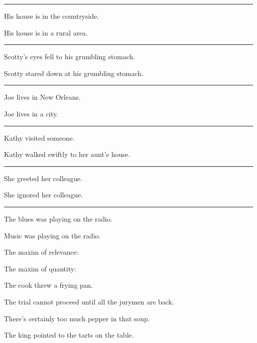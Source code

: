 \documentclass[addpoints]{exam}
\begin{document}
\begin{questions}

        \question[1] \rule{4cm}{0.4pt} \parbox[t]{\linewidth}{
                                         His house is in the countryside.

                                         His house is in a rural area.
                                       }
          \newpage
        \question[1] \rule{4cm}{0.4pt} \parbox[t]{\linewidth}{
                                         Scotty's eyes fell to his grumbling stomach.

                                         Scotty stared down at his grumbling stomach.
                                       }
        \question[1] \rule{4cm}{0.4pt} \parbox[t]{\linewidth}{
                                         Joe lives in New Orleans.

                                         Joe lives in a city.
                                       }
        \question[1] \rule{4cm}{0.4pt} \parbox[t]{\linewidth}{
                                         Kathy visited someone.

                                         Kathy walked swiftly to her aunt's house.
                                       }
        \question[1] \rule{4cm}{0.4pt} \parbox[t]{\linewidth}{
                                         She greeted her colleague.

                                         She ignored her colleague.
                                       }
        \question[1] \rule{4cm}{0.4pt} \parbox[t]{\linewidth}{
                                         The blues was playing on the radio.

                                         Music was playing on the radio.
                                       }

        \question[2] The maxim of relevance: \hrulefill

          \hrulefill
        \question[2] The maxim of quantity: \hrulefill

          \hrulefill

        \question[1] The cook threw a frying pan.

          \hrulefill
        \question[1] The trial cannot proceed until all the jurymen are back.

          \hrulefill
        \question[1] There's certainly too much pepper in that soup.

          \hrulefill
        \question[1] The king pointed to the tarts on the table.

          \hrulefill

  \end{questions}

  \vspace{1.25cm}

  \begin{center}
    \gradetable[v][pages]
  \end{center}
\end{document}
